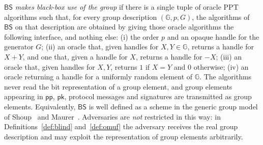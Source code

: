 \documentclass{aicr-conjecture}
\newcommand{\BS}{\mathsf{BS}}
\newcommand{\GG}{\mathbb{G}}
\newcommand{\pubp}{\mathsf{pp}}
\newcommand{\pubk}{\mathsf{pk}}
\begin{document}
\begin{definition}\label{def:bb}
$\BS$ \emph{makes black-box use of the group} if there is a single tuple
of oracle PPT algorithms such that, for every group description
$(\GG, p, G)$, the algorithms of $\BS$ on that description are obtained by
giving those oracle algorithms the following interface, and nothing else:
(i) the order $p$ and an opaque handle for the generator $G$; (ii) an
oracle that, given handles for $X, Y \in \GG$, returns a handle for
$X + Y$, and one that, given a handle for $X$, returns a handle for $-X$;
(iii) an oracle that, given handles for $X, Y$, returns $1$ if $X = Y$ and
$0$ otherwise; (iv) an oracle returning a handle for a uniformly random
element of $\GG$. The algorithms never read the bit representation of a
group element, and group elements appearing in $\pubp$, $\pubk$, protocol
messages and signatures are transmitted as group elements. Equivalently,
$\BS$ is well defined as a scheme in the generic group model of
Shoup~\cite{Sho97} and Maurer~\cite{Mau05}. Adversaries are \emph{not}
restricted in this way: in Definitions~\ref{def:blind} and~\ref{def:omuf}
the adversary receives the real group description and may exploit the
representation of group elements arbitrarily.
\end{definition}
\end{document}
